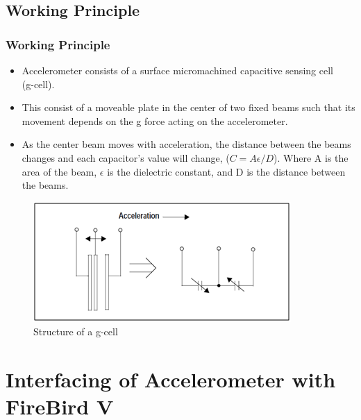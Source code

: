 \documentclass[table,10pt,red]{beamer}	%
\begin{document}
\subsection{Working Principle}
\begin{frame}
	\frametitle{Working Principle}
 		\pause

\begin{minipage}[c]{0.6\textwidth}
			\begin{itemize}
\justifying
\item <+-|alert@+>  Accelerometer consists of a surface micromachined capacitive sensing cell\\ (g-cell).
\item <+-|alert@+>  This consist of a moveable plate in the center of two fixed beams such that its movement depends on the g force acting on the accelerometer.
\item <+-|alert@+>  As the center beam moves with acceleration, the distance between the beams changes and each capacitor's value will change, ($C = A \epsilon /D$). Where A is the area of the beam, $\epsilon$ is the dielectric constant, and  D is the distance between the beams.


\end{itemize}
		\end{minipage}
\begin{minipage}[c]{0.37\textwidth}
\begin{figure}
\hspace*{5mm}\includegraphics[width=\linewidth]{gcell.png}
\caption{Structure of a g-cell}
\end{figure}
		\end{minipage}

\end{frame}




\section{Interfacing of Accelerometer with FireBird V} 
\end{document}
